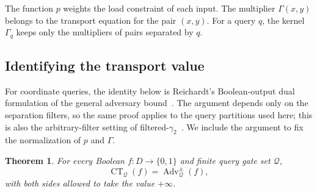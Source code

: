 \documentclass[11pt]{article}
\numberwithin{equation}{section}
\newtheorem{theorem}[definition]{Theorem}
\theoremstyle{remark}
\begin{document}
The function $p$ weights the load constraint of each input. The multiplier $\Gamma(x,y)$ belongs to the transport equation for the pair $(x,y)$. For a query $q$, the kernel $\Gamma_q$ keeps only the multipliers of pairs separated by $q$.


\subsection{Identifying the transport value}
\label{subsec:correlation-adversary-identification}

For coordinate queries, the identity below is Reichardt's Boolean-output dual formulation of the general adversary bound~\cite{Reichardt2009}. The argument depends only on the separation filters, so the same proof applies to the query partitions used here; this is also the arbitrary-filter setting of filtered-$\gamma_2$~\cite{LeeMittalReichardtSpalekSzegedy2011}. We include the argument to fix the normalization of $p$ and $\Gamma$.

\begin{theorem}
\label{thm:correlation-transport-adversary}
For every Boolean $f:D\to\{0,1\}$ and finite query gate set $\mathcal Q$,
\begin{equation}
    \operatorname{CT}_{\mathcal Q}(f)
    =
    \operatorname{Adv}^{\pm}_{\mathcal Q}(f),
\end{equation}
with both sides allowed to take the value $+\infty$.
\end{theorem}
\end{document}

